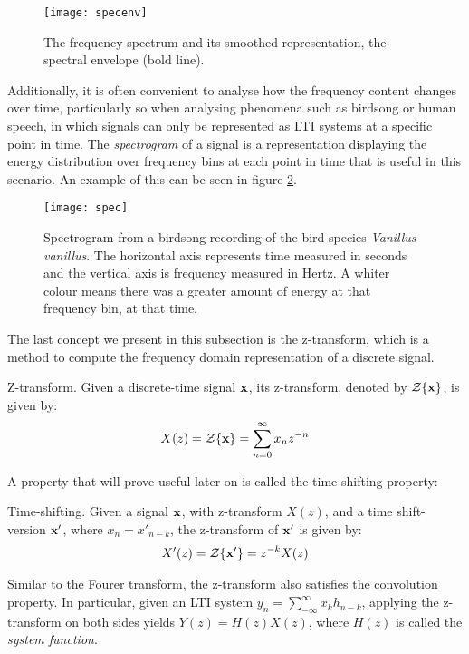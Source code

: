 \documentclass[../main.tex]{subfiles}
\begin{document}
\begin{figure}[t]
\centering
\texttt{[image: specenv]}
\caption{The frequency spectrum and its smoothed representation, the spectral envelope (bold line).}
\label{fig_specenv}
\end{figure}
\par Additionally, it is often convenient to analyse how the frequency content changes over time, particularly so when analysing phenomena such as birdsong or human speech, in which signals can only be represented as LTI systems at a specific point in time. The \emph{spectrogram} of a signal is a representation displaying the energy distribution over frequency bins at each point in time that is useful in this scenario. An example of this can be seen in figure \ref{fig_spec}.
\begin{figure}[t]
\centering
\texttt{[image: spec]}
\caption{Spectrogram from a birdsong recording of the bird species \emph{Vanillus vanillus}. The horizontal axis represents time measured in seconds and the vertical axis is frequency measured in Hertz. A whiter colour means there was a greater amount of energy at that frequency bin, at that time.}
\label{fig_spec}
\end{figure}
\par The last concept we present in this subsection is the z-transform, which is a method to compute the frequency domain representation of a discrete signal.
\begin{definition}{Z-transform.} \label{def_ztransform}
Given a discrete-time signal $\mathbf{x}$, its z-transform, denoted by $\mathcal{Z}\{\mathbf{x}\}$, is given by:
\begin{align*}
X(z) = \mathcal{Z}\{\mathbf{x}\} = \sum_{n=0}^\infty{x_nz^{-n}}
\end{align*}
\end{definition}
\par A property that will prove useful later on is called the time shifting property:
\begin{definition}{Time-shifting.} \label{def_timeshitfing}
Given a signal $\mathbf{x}$, with z-transform $X(z)$, and a time shift-version $\mathbf{x}'$, where $x_n = x'_{n-k}$, the z-transform of $\mathbf{x}'$ is given by:
\begin{align*}
X'(z) = \mathcal{Z}\{\mathbf{x}'\} = z^{-k}X(z)
\end{align*}
\end{definition}
\par Similar to the Fourer transform, the z-transform also satisfies the convolution property. In particular, given an LTI system $y_n = \sum_{-\infty}^\infty{x_kh_{n-k}}$, applying the z-transform on both sides yields $Y(z) = H(z)X(z)$, where $H(z)$ is called the \emph{system function}.
\end{document}
